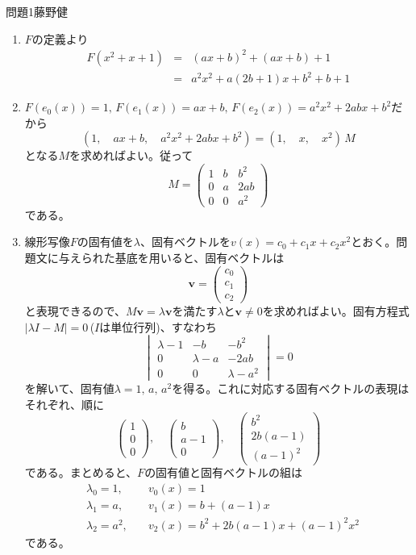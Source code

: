 \documentclass[fleqn]{jbook}
\begin{document}
\begin{answer}{問題1}{藤野健}
\setcounter{equation}{0}

\begin{enumerate}
    \item $F$の定義より
\begin{eqnarray*}
    F(x^2+x+1) & = & (ax + b)^2 + (ax + b) + 1 \\
    & = & a^2x^2 + a(2b+1)x + b^2+b+1
\end{eqnarray*}

    \item $F(e_0(x)) = 1, \, F(e_1(x)) = ax+b, \, F(e_2(x)) = a^2x^2 + 2abx + b^2$だから
\[
    (1, \quad ax+b , \quad a^2x^2 + 2abx + b^2) = (1, \quad x , \quad x^2) \, M
\]
となる$M$を求めればよい。従って
\[
    M = \begin{pmatrix}
	    1 & b & b^2 \\
	    0 & a & 2ab \\
	    0 & 0 & a^2 
	\end{pmatrix}
\]
である。

    \item 線形写像$F$の固有値を$\lambda$、固有ベクトルを$v(x) = c_0 + c_1 x + c_2 x^2$とおく。問題文に与えられた基底を用いると、固有ベクトルは
\[
        \bm{v} = \begin{pmatrix}
		     c_0 \\
		     c_1 \\
		     c_2
		 \end{pmatrix}
\]
と表現できるので、$M \bm{v} = \lambda \bm{v}$を満たす$\lambda$と$\bm{v}\neq0$を求めればよい。固有方程式$|\lambda I - M | = 0$\,($I$は単位行列)、すなわち
\[
    \begin{vmatrix}
	\lambda - 1 &          -b & -b^2 \\
	          0 & \lambda - a & -2ab \\
	          0 &           0 & \lambda - a^2
    \end{vmatrix}
	  = 0
\]
を解いて、固有値$\lambda = 1, \, a, \, a^2$を得る。これに対応する固有ベクトルの表現はそれぞれ、順に
\[
    \begin{pmatrix} 
	1 \\
	0 \\ 
	0
    \end{pmatrix}, \quad
    \begin{pmatrix}
	b \\
	a - 1 \\
	0
    \end{pmatrix}, \quad
    \begin{pmatrix}
	b^2 \\
	2b(a - 1) \\
	(a - 1)^2
    \end{pmatrix}
\]
である。まとめると、$F$の固有値と固有ベクトルの組は
\begin{eqnarray*}
    & \lambda_0 = 1,    \quad & v_0(x) = 1 \\
    & \lambda_1 = a,    \quad & v_1(x) = b + (a-1)x \\
    & \lambda_2 = a^2,  \quad & v_2(x) = b^2 + 2b(a-1)x + (a-1)^2 x^2
\end{eqnarray*}
である。


\end{enumerate}
\end{answer}
\end{document}
